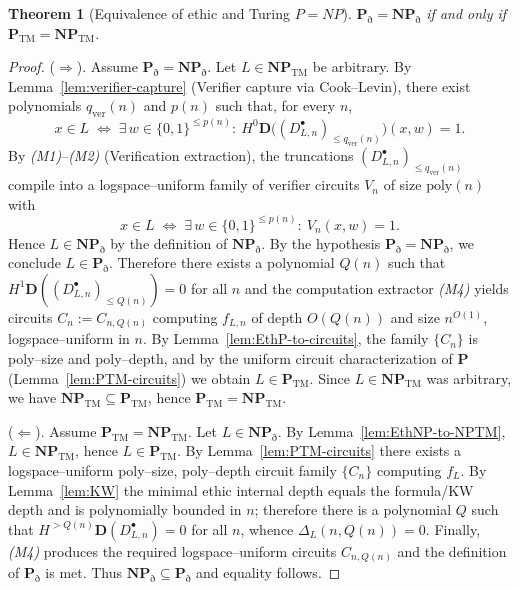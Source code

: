 \documentclass[12pt]{article}
\newcommand{\HD}[2]{H^{#1}\mathbf D(#2)} %
\theoremstyle{plain}
\newtheorem{theorem}{Theorem}[section]
\theoremstyle{definition}
\theoremstyle{remark}
\numberwithin{equation}{section}
\begin{document}
\begin{theorem}[Equivalence of ethic and Turing \(P{=}NP\)]
\(\mathbf P_{\eth}=\mathbf{NP}_{\eth}\) if and only if \(\mathbf P_{\mathrm{TM}}=\mathbf{NP}_{\mathrm{TM}}\).
\end{theorem}

\begin{proof}
(\(\Rightarrow\)).
Assume \(\mathbf P_{\eth}=\mathbf{NP}_{\eth}\).
Let \(L\in \mathbf{NP}_{\mathrm{TM}}\) be arbitrary.
By Lemma~\ref{lem:verifier-capture} (Verifier capture via Cook--Levin), there exist polynomials \(q_{\mathrm{ver}}(n)\) and \(p(n)\) such that, for every \(n\),
\[
x\in L \;\Longleftrightarrow\; \exists\,w\in\{0,1\}^{\le p(n)}:\ 
H^{0}\mathbf D\!\big((D_{L,n}^{\bullet})_{\le q_{\mathrm{ver}}(n)}\big)(x,w)=1 .
\]
By \emph{(M1)}–\emph{(M2)} (Verification extraction), the truncations \((D_{L,n}^{\bullet})_{\le q_{\mathrm{ver}}(n)}\) compile into a logspace–uniform family of verifier circuits \(V_n\) of size \(\mathrm{poly}(n)\) with
\[
x\in L \;\Longleftrightarrow\; \exists\,w\in\{0,1\}^{\le p(n)}:\ V_n(x,w)=1 .
\]
Hence \(L\in \mathbf{NP}_{\eth}\) by the definition of \(\mathbf{NP}_{\eth}\).
By the hypothesis \(\mathbf P_{\eth}=\mathbf{NP}_{\eth}\), we conclude \(L\in \mathbf P_{\eth}\).
Therefore there exists a polynomial \(Q(n)\) such that \(\HD{1}{(D_{L,n}^{\bullet})_{\le Q(n)}}=0\) for all \(n\) and the computation extractor \emph{(M4)} yields circuits \(C_n:=C_{n,Q(n)}\) computing \(f_{L,n}\) of depth \(O(Q(n))\) and size \(n^{O(1)}\), logspace–uniform in \(n\).
By Lemma~\ref{lem:EthP-to-circuits}, the family \(\{C_n\}\) is poly–size and poly–depth, and by the uniform circuit characterization of \(\mathbf P\) (Lemma~\ref{lem:PTM-circuits}) we obtain \(L\in \mathbf P_{\mathrm{TM}}\).
Since \(L\in \mathbf{NP}_{\mathrm{TM}}\) was arbitrary, we have \(\mathbf{NP}_{\mathrm{TM}}\subseteq \mathbf P_{\mathrm{TM}}\), hence \(\mathbf P_{\mathrm{TM}}=\mathbf{NP}_{\mathrm{TM}}\).

(\(\Leftarrow\)).
Assume \(\mathbf P_{\mathrm{TM}}=\mathbf{NP}_{\mathrm{TM}}\).
Let \(L\in \mathbf{NP}_{\eth}\).
By Lemma~\ref{lem:EthNP-to-NPTM}, \(L\in \mathbf{NP}_{\mathrm{TM}}\), hence \(L\in \mathbf P_{\mathrm{TM}}\).
By Lemma~\ref{lem:PTM-circuits} there exists a logspace–uniform poly–size, poly–depth circuit family \(\{C_n\}\) computing \(f_{L}\).
By Lemma~\ref{lem:KW} the minimal ethic internal depth equals the formula/KW depth and is polynomially bounded in \(n\); therefore there is a polynomial \(Q\) such that \(H^{>Q(n)}\mathbf D(D_{L,n}^{\bullet})=0\) for all \(n\), whence \(\Delta_{L}(n,Q(n))=0\).
Finally, \emph{(M4)} produces the required logspace–uniform circuits \(C_{n,Q(n)}\) and the definition of \(\mathbf P_{\eth}\) is met.
Thus \(\mathbf{NP}_{\eth}\subseteq \mathbf P_{\eth}\) and equality follows.
\end{proof}
\end{document}
